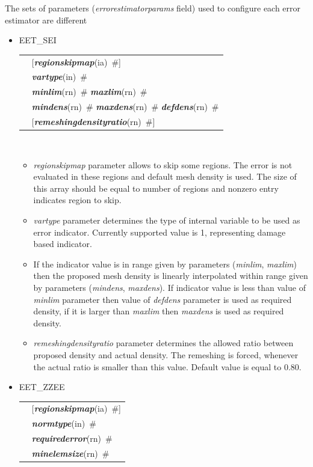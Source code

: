 \documentclass[a4paper]{article}
\makeatletter
\newcommand{\param}[1]{{\em #1}}
\newcommand{\keywordnotype}[1]{\mbox{{\it{\bf{#1}}}}}
\newcommand{\keyword}[2]{\mbox{{\keywordnotype{#1}\tiny (#2)}}}
\newcommand{\field}[2]{\mbox{\keyword{#1}{#2}~\#}}
\newcommand{\optField}[2]{\mbox{[\field{#1}{#2}]}}
\newenvironment{record}[1][]{\begin{tabular}{|ll}}{\end{tabular}\\}
\newcommand{\recentry}[2]{{#1}&{#2}\\}
\newcounter{rcc}
\newenvironment{record}[1][\textwidth]{\setcounter{rcc}{0}\begin{tabular*}{#1}{|ll@{\extracolsep{\fill}}r}}{\end{tabular*}\\}
\newcommand{\recentry}[2]{\ifthenelse{\value{rcc}>0}{&$\backslash$ \\}{\setcounter{rcc}{1}}{#1}&{#2}}
\makeatother
\begin{document}
The sets of parameters (\param{errorestimatorparams} field) used to
configure each error estimator are different
\begin{itemize}
\item
EET\_SEI\\
\begin{record}[0.9\textwidth]
\recentry{\hspace{2cm}}{\optField{regionskipmap}{ia}} \recentry{}{\field{vartype}{in}}
\recentry{}{\field{minlim}{rn} \field{maxlim}{rn}}
\recentry{}{\field{mindens}{rn} \field{maxdens}{rn} \field{defdens}{rn}}
\recentry{}{\optField{remeshingdensityratio}{rn}}
\end{record}
\begin{itemize}
\item \param{regionskipmap} parameter allows to skip some regions. The
error is not evaluated in these regions and default mesh density is
used. The size of this array should be equal to number of regions and
nonzero entry indicates region to skip.
\item \param{vartype} parameter determines the type of internal
variable to be used as error indicator. Currently supported value is
1, representing damage based indicator.
\item If the indicator value is in range given by parameters (\param{minlim},
 \param{maxlim}) then the proposed mesh density is linearly
interpolated within range given by parameters (\param{mindens}, \param{maxdens}). If
indicator value is less than value of \param{minlim} parameter then
value of \param{defdens} parameter is used as
required density, if it is larger than \param{maxlim} then
\param{maxdens} is used as required density.
\item
\param{remeshingdensityratio} parameter determines the allowed ratio
between proposed density and actual density.
The remeshing is forced, whenever the actual ratio is smaller than
this value. Default value is equal to 0.80.
\end{itemize}
\item
EET\_ZZEE\\
\begin{record}[0.9\textwidth]
\recentry{\hspace{2cm}}{\optField{regionskipmap}{ia}}
\recentry{}{\field{normtype}{in}}
\recentry{}{\field{requirederror}{rn}} \recentry{}{\field{minelemsize}{rn}}
\end{record}


\end{itemize}
\end{document}

